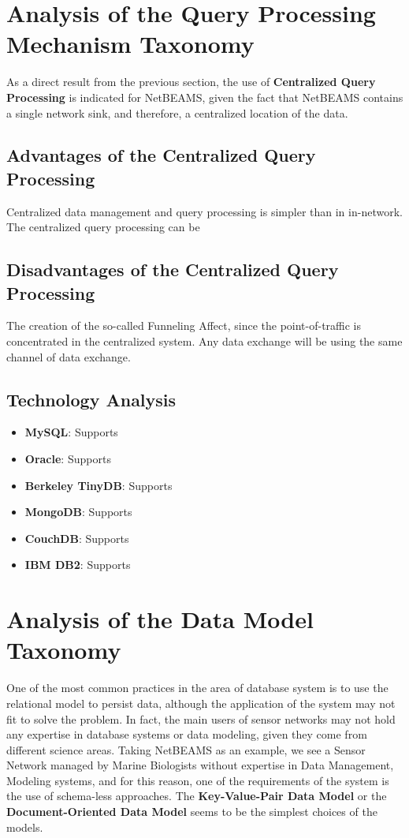 \section{Analysis of the Query Processing Mechanism Taxonomy}

As a direct result from the previous section, the use of \textbf{Centralized Query
Processing} is indicated for NetBEAMS, given the fact that NetBEAMS contains
a single network sink, and therefore, a centralized location of the data.

\subsection{Advantages of the Centralized Query Processing}

Centralized data management and query processing is simpler than in in-network.
The centralized query processing can be 

\subsection{Disadvantages of the Centralized Query Processing}

The creation of the so-called Funneling Affect, since the point-of-traffic is
concentrated in the centralized system. Any data exchange will be using the
same channel of data exchange.

\subsection{Technology Analysis}

\begin{itemize}
  \item \textbf{MySQL}: Supports
  \item \textbf{Oracle}: Supports
  \item \textbf{Berkeley TinyDB}: Supports
  \item \textbf{MongoDB}: Supports
  \item \textbf{CouchDB}: Supports
  \item \textbf{IBM DB2}: Supports
\end{itemize}

\section{Analysis of the Data Model Taxonomy}

One of the most common practices in the area of database system is to use the
relational model to persist data, although the application of the system may
not fit to solve the problem. In fact, the main users of sensor networks may
not hold any expertise in database systems or data modeling, given they come
from different science areas. Taking NetBEAMS as an example, we see a Sensor
Network managed by Marine Biologists without expertise in Data Management,
Modeling systems, and for this reason, one of the requirements of the system is
the use of schema-less approaches. The \textbf{Key-Value-Pair Data Model} or the
\textbf{Document-Oriented Data Model} seems to be the simplest choices of the
models.

